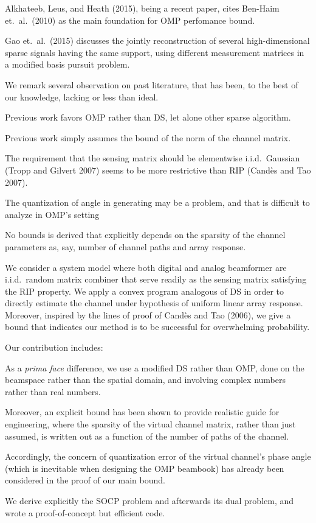 Alkhateeb, Leus, and Heath (2015), being a recent paper, cites Ben-Haim et.\ al.\ (2010) as the main foundation for OMP perfomance bound.

Gao et.\ al.\ (2015) discusses the jointly reconstruction of several high-dimensional sparse signals having the same support, using different measurement matrices in a modified basis pursuit problem.

We remark several observation on past literature, that has been, to the best of our knowledge, lacking or less than ideal.

\startitemize
\item Previous work favors OMP rather than DS, let alone other sparse algorithm.
\item Previous work simply assumes the bound of the norm of the channel matrix.
\item The requirement that the sensing matrix should be elementwise i.i.d.\ Gaussian (Tropp and Gilvert 2007) seems to be more restrictive than RIP (Cand\`es and Tao 2007).
\item The quantization of angle in generating may be a problem, and that is difficult to analyze in OMP's setting
\item No bounds is derived that explicitly depends on the sparsity of the channel parameters as, say, number of channel paths and array response.
\stopitemize

\startsection [title={Contribution}]

We consider a system model where both digital and analog beamformer are i.i.d.\ random matrix combiner that serve readily as the sensing matrix satisfying the RIP property.
We apply a convex program analogous of DS in order to directly estimate the channel under hypothesis of uniform linear array response.
Moreover, inspired by the lines of proof of Cand\`es and Tao (2006), we give a bound that indicates our method is to be successful for overwhelming probability.

Our contribution includes:

\startitemize
\item As a {\it prima face} difference, we use a modified DS rather than OMP, done on the beamspace rather than the spatial domain, and involving complex numbers rather than real numbers.
\item Moreover, an explicit bound has been shown to provide realistic guide for engineering, where the sparsity of the virtual channel matrix, rather than just assumed, is written out as a function of the number of paths of the channel.
\item Accordingly, the concern of quantization error of the virtual channel's phase angle (which is inevitable when designing the OMP beambook) has already been considered in the proof of our main bound.
\item We derive explicitly the SOCP problem and afterwards its dual problem, and wrote a proof-of-concept but efficient code.
\stopitemize

\stopsection

\stopchapter

